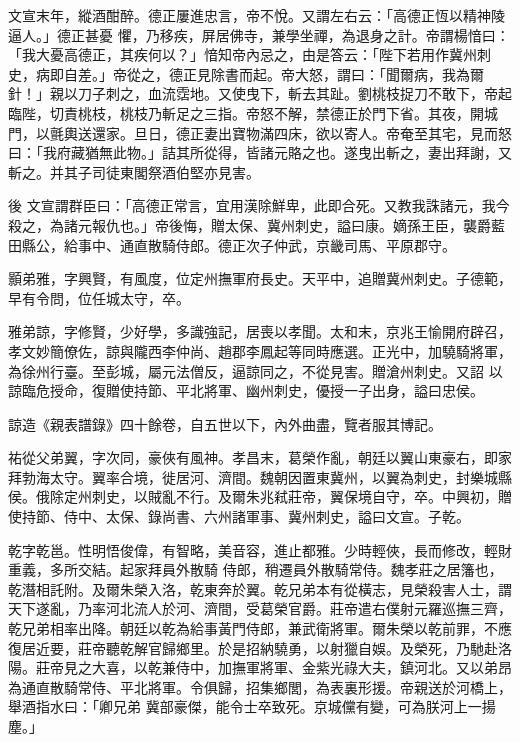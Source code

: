 \begin{pinyinscope}
 文宣末年，縱酒酣醉。德正屢進忠言，帝不悅。又謂左右云：「高德正恆以精神陵逼人。」德正甚憂
 懼，乃移疾，屏居佛寺，兼學坐禪，為退身之計。帝謂楊愔曰：「我大憂高德正，其疾何以？」愔知帝內忌之，由是答云：「陛下若用作冀州刺史，病即自差。」帝從之，德正見除書而起。帝大怒，謂曰：「聞爾病，我為爾針！」親以刀子刺之，血流霑地。又使曳下，斬去其趾。劉桃枝捉刀不敢下，帝起臨陛，切責桃枝，桃枝乃斬足之三指。帝怒不解，禁德正於門下省。其夜，開城門，以氈輿送還家。旦日，德正妻出寶物滿四床，欲以寄人。帝奄至其宅，見而怒曰：「我府藏猶無此物。」詰其所從得，皆諸元賂之也。遂曳出斬之，妻出拜謝，又斬之。并其子司徒東閣祭酒伯堅亦見害。



 後
 文宣謂群臣曰：「高德正常言，宜用漢除鮮卑，此即合死。又教我誅諸元，我今殺之，為諸元報仇也。」帝後悔，贈太保、冀州刺史，謚曰康。嫡孫王臣，襲爵藍田縣公，給事中、通直散騎侍郎。德正次子仲武，京畿司馬、平原郡守。



 顥弟雅，字興賢，有風度，位定州撫軍府長史。天平中，追贈冀州刺史。子德範，早有令問，位任城太守，卒。



 雅弟諒，字修賢，少好學，多識強記，居喪以孝聞。太和末，京兆王愉開府辟召，孝文妙簡僚佐，諒與隴西李仲尚、趙郡李鳳起等同時應選。正光中，加驍騎將軍，為徐州行臺。至彭城，屬元法僧反，逼諒同之，不從見害。贈滄州刺史。又詔
 以諒臨危授命，復贈使持節、平北將軍、幽州刺史，優授一子出身，謚曰忠侯。



 諒造《親表譜錄》四十餘卷，自五世以下，內外曲盡，覽者服其博記。



 祐從父弟翼，字次同，豪俠有風神。孝昌末，葛榮作亂，朝廷以翼山東豪右，即家拜勃海太守。翼率合境，徙居河、濟間。魏朝因置東冀州，以翼為刺史，封樂城縣侯。俄除定州刺史，以賊亂不行。及爾朱兆弒莊帝，翼保境自守，卒。中興初，贈使持節、侍中、太保、錄尚書、六州諸軍事、冀州刺史，謚曰文宣。子乾。



 乾字乾邕。性明悟俊偉，有智略，美音容，進止都雅。少時輕俠，長而修改，輕財重義，多所交結。起家拜員外散騎
 侍郎，稍遷員外散騎常侍。魏孝莊之居籓也，乾潛相託附。及爾朱榮入洛，乾東奔於翼。乾兄弟本有從橫志，見榮殺害人士，謂天下遂亂，乃率河北流人於河、濟間，受葛榮官爵。莊帝遣右僕射元羅巡撫三齊，乾兄弟相率出降。朝廷以乾為給事黃門侍郎，兼武衛將軍。爾朱榮以乾前罪，不應復居近要，莊帝聽乾解官歸鄉里。於是招納驍勇，以射獵自娛。及榮死，乃馳赴洛陽。莊帝見之大喜，以乾兼侍中，加撫軍將軍、金紫光祿大夫，鎮河北。又以弟昂為通直散騎常侍、平北將軍。令俱歸，招集鄉閭，為表裏形援。帝親送於河橋上，舉酒指水曰：「卿兄弟
 冀部豪傑，能令士卒致死。京城儻有變，可為朕河上一揚塵。」




\end{pinyinscope}
